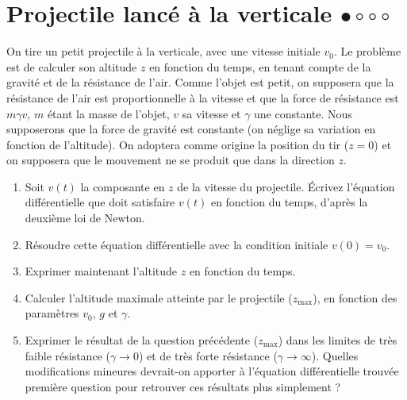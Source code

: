 \newpage

\section{Projectile lancé à la verticale $\bullet\circ\circ\circ$}

On tire un petit projectile à la verticale, avec une vitesse initiale $v_0$. Le problème est de calculer son altitude $z$ en fonction du temps, en tenant compte de la gravité et de la résistance de l'air. Comme l'objet est petit, on supposera que la résistance de l'air est proportionnelle à la vitesse et que la force de résistance est $m\gamma v$, $m$ étant la masse de l'objet, $v$ sa vitesse et $\gamma$ une constante. Nous supposerons que la force de gravité est constante (on néglige sa variation en fonction de l'altitude). On adoptera comme origine la position du tir ($z=0$) et on supposera que le mouvement ne se produit que dans la direction $z$.

\begin{enumerate}
\item Soit $v(t)$ la composante en $z$ de la vitesse du projectile. \'{E}crivez l'équation différentielle que doit satisfaire $v(t)$ en fonction du temps, d'après la deuxième loi de Newton.
\item Résoudre cette équation différentielle avec la condition initiale $v(0)=v_0$.
\item Exprimer maintenant l'altitude $z$ en fonction du temps.
\item Calculer l'altitude maximale atteinte par le projectile ($z_\mathrm{max}$), en fonction des paramètres $v_0$, $g$ et $\gamma$.
\item Exprimer le résultat de la question précédente ($z_\mathrm{max}$) dans les limites de très faible résistance ($\gamma \rightarrow 0$) et de très forte résistance ($\gamma \rightarrow \infty$). Quelles modifications mineures devrait-on apporter à l'équation différentielle trouvée première question pour retrouver ces résultats plus simplement ?

\end{enumerate}

\newpage

